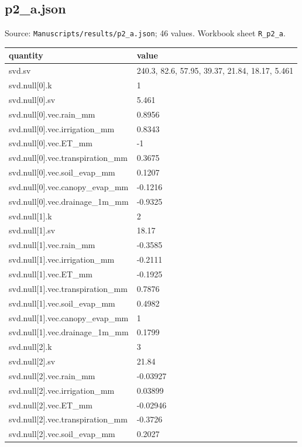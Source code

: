 \subsection*{p2\_a.json}
\noindent\small Source: \nolinkurl{Manuscripts/results/p2_a.json}; 46 values. Workbook sheet \texttt{R\_p2\_a}.\par
{\scriptsize\begin{longtable}{p{}p{}}\toprule\textbf{quantity} & \textbf{value}\\\midrule\endhead
{}svd.sv & 240.3, 82.6, 57.95, 39.37, 21.84, 18.17, 5.461\\
{}svd.null[0].k & 1\\
{}svd.null[0].sv & 5.461\\
{}svd.null[0].vec.rain\_mm & 0.8956\\
{}svd.null[0].vec.irrigation\_mm & 0.8343\\
{}svd.null[0].vec.ET\_mm & -1\\
{}svd.null[0].vec.transpiration\_mm & 0.3675\\
{}svd.null[0].vec.soil\_evap\_mm & 0.1207\\
{}svd.null[0].vec.canopy\_evap\_mm & -0.1216\\
{}svd.null[0].vec.drainage\_1m\_mm & -0.9325\\
{}svd.null[1].k & 2\\
{}svd.null[1].sv & 18.17\\
{}svd.null[1].vec.rain\_mm & -0.3585\\
{}svd.null[1].vec.irrigation\_mm & -0.2111\\
{}svd.null[1].vec.ET\_mm & -0.1925\\
{}svd.null[1].vec.transpiration\_mm & 0.7876\\
{}svd.null[1].vec.soil\_evap\_mm & 0.4982\\
{}svd.null[1].vec.canopy\_evap\_mm & 1\\
{}svd.null[1].vec.drainage\_1m\_mm & 0.1799\\
{}svd.null[2].k & 3\\
{}svd.null[2].sv & 21.84\\
{}svd.null[2].vec.rain\_mm & -0.03927\\
{}svd.null[2].vec.irrigation\_mm & 0.03899\\
{}svd.null[2].vec.ET\_mm & -0.02946\\
{}svd.null[2].vec.transpiration\_mm & -0.3726\\
{}svd.null[2].vec.soil\_evap\_mm & 0.2027\\

\end{longtable}}
